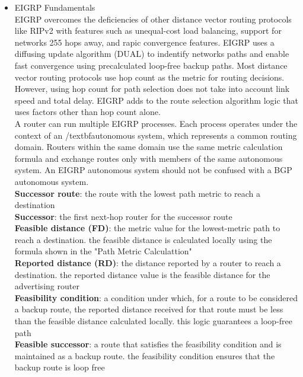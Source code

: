 \documentclass{article}
\begin{document}
\begin{itemize}
	\item EIGRP Fundamentals\\
		
		EIGRP overcomes the deficiencies of other distance vector routing protocols like RIPv2 with features such as unequal-cost load balancing, support for networks 255 hops away, and rapic convergence features. EIGRP uses a diffusing update algorithm (DUAL) to indentify networks paths and enable fast convergence using precalculated loop-free backup paths. Most distance vector routing protocols use hop count as the metric for routing decisions. However, using hop count for path selection does not take into account link speed and total delay. EIGRP adds to the route selection algorithm logic that uses factors other than hop count alone.\\

		A router can run multiple EIGRP processes. Each process operates under the context of an /textbf{autonomous system}, which represents a common routing domain. Routers within the same domain use the same metric calculation formula and exchange routes only with members of the same autonomous system. An EIGRP autonomous system should not be confused with a BGP autonomous system.\\

		\textbf{Successor route}: the route with the lowest path metric to reach a destination\\

		\textbf{Successor}: the first next-hop router for the successor route\\

		\textbf{Feasible distance (FD)}: the metric value for the lowest-metric path to reach a destination. the feasible distance is calculated locally using the formula shown in the "Path Metric Calculattion"\\

		\textbf{Reported distance (RD)}: the distance reported by a router to reach a destination. the reported distance value is the feasible distance for the advertising router\\

		\textbf{Feasibility condition}: a condition under which, for a route to be considered a backup route, the reported distance received for that route must be less than the feasible distance calculated locally. this logic guarantees a loop-free path\\

		\textbf{Feasible successor}: a route that satisfies the feasibility condition and is maintained as a backup route. the feasibility condition ensures that the backup route is loop free\\



\end{itemize}
\end{document}
